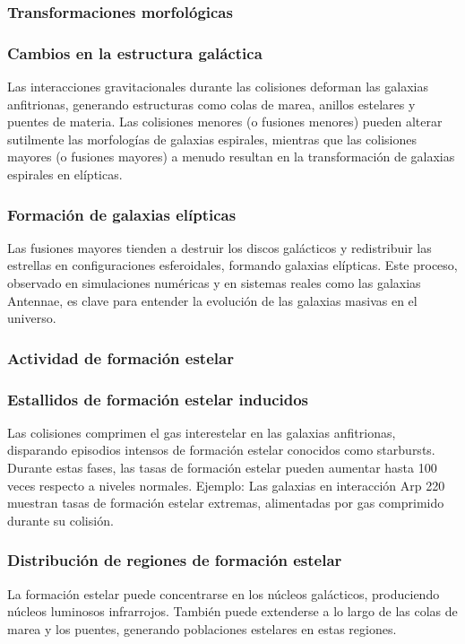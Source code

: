 \documentclass{article}
\begin{document}
\subsubsection{Transformaciones morfológicas}
\subsubsection*{Cambios en la estructura galáctica}

Las interacciones gravitacionales durante las colisiones deforman las galaxias anfitrionas, generando estructuras como colas de marea, anillos estelares y puentes de materia. Las colisiones menores (o fusiones menores) pueden alterar sutilmente las morfologías de galaxias espirales, mientras que las colisiones mayores (o fusiones mayores) a menudo resultan en la transformación de galaxias espirales en elípticas.
\subsubsection*{Formación de galaxias elípticas}

Las fusiones mayores tienden a destruir los discos galácticos y redistribuir las estrellas en configuraciones esferoidales, formando galaxias elípticas.
Este proceso, observado en simulaciones numéricas y en sistemas reales como las galaxias Antennae, es clave para entender la evolución de las galaxias masivas en el universo.
\subsubsection{Actividad de formación estelar}
\subsubsection*{Estallidos de formación estelar inducidos}
Las colisiones comprimen el gas interestelar en las galaxias anfitrionas, disparando episodios intensos de formación estelar conocidos como starbursts. Durante estas fases, las tasas de formación estelar pueden aumentar hasta 100 veces respecto a niveles normales.
Ejemplo: Las galaxias en interacción Arp 220 muestran tasas de formación estelar extremas, alimentadas por gas comprimido durante su colisión.
\subsubsection*{Distribución de regiones de formación estelar}

La formación estelar puede concentrarse en los núcleos galácticos, produciendo núcleos luminosos infrarrojos.
También puede extenderse a lo largo de las colas de marea y los puentes, generando poblaciones estelares en estas regiones.
\end{document}
